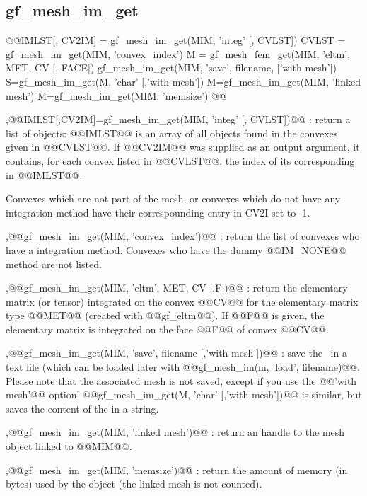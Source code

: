 \subsection{gf\_mesh\_im\_get}
\begin{synopsis}
@@\tstr IMLST[, \tivec CV2IM] = gf\_mesh\_im\_get(MIM, 'integ' [, \tivec CVLST])
\tivec CVLST = gf\_mesh\_im\_get(MIM, 'convex\_index')
\tmat M = gf\_mesh\_fem\_get(MIM, 'eltm', \teltm MET, \tint CV [, \tint FACE])
gf\_mesh\_im\_get(MIM, 'save', \tstr filename, ['with mesh'])
\tstr S=gf_mesh_im_get(M, 'char' [,'with mesh'])
\tmesh M=gf_mesh_im_get(MIM, 'linked mesh')
M=gf_mesh_im_get(MIM, 'memsize')
@@\end{synopsis}
\begin{cmddescription}
  \sep{@@IMLST[,CV2IM]=gf\_mesh\_im\_get(MIM, 'integ' [, \tivec
    CVLST])@@} :  return a list of \tinteg
  objects: @@IMLST@@ is an array of all \tinteg objects found in the
  convexes given in @@CVLST@@. If @@CV2IM@@ was supplied as an output
  argument, it contains, for each convex listed in @@CVLST@@, the
  index of its corresponding \tinteg in @@IMLST@@.

  Convexes which are not part of the mesh, or convexes which do
  not have any integration method have their correspounding entry
  in CV2I set to -1.

  \sep{@@gf\_mesh\_im\_get(MIM, 'convex\_index')@@} :
  return the list of convexes who have a integration method. Convexes
  who have the dummy @@IM_NONE@@ method are not listed.

  \sep{@@gf\_mesh\_im\_get(MIM, 'eltm', MET, CV [,F])@@} :
   return the elementary matrix (or tensor)
  integrated on the convex @@CV@@ for the elementary matrix type
  @@MET@@ (created with @@gf_eltm@@).  If @@F@@ is given, the
  elementary matrix is integrated on the face @@F@@ of convex @@CV@@.

  \sep{@@gf\_mesh\_im\_get(MIM, 'save', filename [,'with mesh'])@@} : save the \tmim\ in a
  text file (which can be loaded later with @@gf\_mesh\_im(m, 'load',
  filename)@@. Please note that the associated mesh is not saved, except if you
  use the @@'with mesh'@@ option! @@gf_mesh_im_get(M, 'char' [,'with mesh'])@@
  is similar, but saves the content of the \tmim in a string.
  
  \sep{@@gf_mesh_im_get(MIM, 'linked mesh')@@} : return an handle to the mesh object
  linked to @@MIM@@.

  \sep{@@gf_mesh_im_get(MIM, 'memsize')@@} : return the amount of memory (in bytes)
  used by the \tmim object (the linked mesh is not counted).
\end{cmddescription}
\newpage


